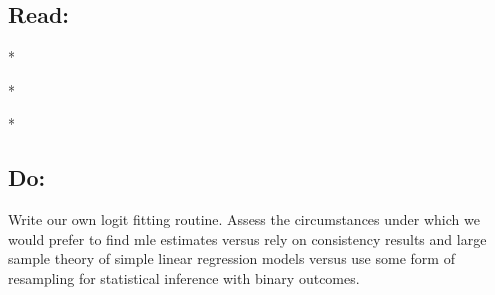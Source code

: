 \documentclass[10pt]{article}
\def\themonth{\ifcase\month\or
  January\or February\or March\or April\or May\or June\or
  July\or August\or September\or October\or November\or December\fi}
\begin{document}
\subsection{Read:}

*\citealp[Chap 14]{fox2008applied}

\citealp[Chap 5]{gelman2007dau}

*\citealp[Chap 6]{gelman2007dau}

*\citealp[Chap 15]{fox2008applied}


\subsection{Do:} Write our own logit fitting routine. Assess the
circumstances under which we would prefer to find mle estimates versus
rely on consistency results and large sample theory of simple linear
regression models versus use some form of resampling for statistical
inference with binary outcomes.

\end{document}
